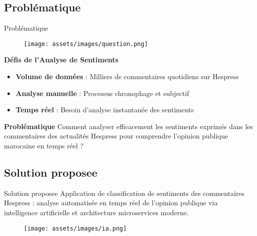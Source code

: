 \subsection{Problématique}
\begin{frame}{Problématique}
    \begin{figure}[H]
        \centering
        \texttt{[image: assets/images/question.png]}
    \end{figure}
    
    \vspace{0.5cm}
    
    \begin{block}{\centering \textbf{Défis de l'Analyse de Sentiments}}
        \begin{itemize}
            \setlength\itemsep{0.6em}
            \item \textbf{Volume de données} : Milliers de commentaires quotidiens sur Hespress
            \item \textbf{Analyse manuelle} : Processus chronophage et subjectif
            \item \textbf{Temps réel} : Besoin d'analyse instantanée des sentiments
        \end{itemize}
    \end{block}
    
    \vspace{0.3cm}
    
    \begin{alertblock}{\centering \textbf{Problématique}}
        \centering
        Comment analyser efficacement les sentiments exprimés dans les commentaires des actualités Hespress pour comprendre l'opinion publique marocaine en temps réel ?
    \end{alertblock}
\end{frame}

\subsection{Solution proposee}
\begin{frame}{Solution proposee}
    Application de classification de sentiments des commentaires Hespress : analyse automatisée en temps réel de l'opinion publique via intelligence artificielle et architecture microservices moderne.
    \begin{figure}[H]
        \centering
        \texttt{[image: assets/images/ia.png]}
    \end{figure}
\end{frame}

